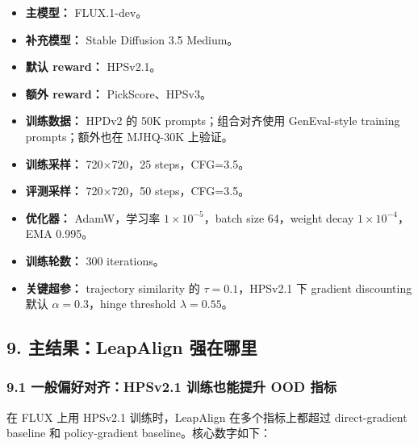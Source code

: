 \begin{itemize}[leftmargin=1.5em]
  \item \textbf{主模型：} FLUX.1-dev。
  \item \textbf{补充模型：} Stable Diffusion 3.5 Medium。
  \item \textbf{默认 reward：} HPSv2.1。
  \item \textbf{额外 reward：} PickScore、HPSv3。
  \item \textbf{训练数据：} HPDv2 的 50K prompts；组合对齐使用 GenEval-style training prompts；额外也在 MJHQ-30K 上验证。
  \item \textbf{训练采样：} 720\(\times\)720，25 steps，CFG=3.5。
  \item \textbf{评测采样：} 720\(\times\)720，50 steps，CFG=3.5。
  \item \textbf{优化器：} AdamW，学习率 \(1\times10^{-5}\)，batch size 64，weight decay \(1\times10^{-4}\)，EMA 0.995。
  \item \textbf{训练轮数：} 300 iterations。
  \item \textbf{关键超参：} trajectory similarity 的 \(\tau=0.1\)，HPSv2.1 下 gradient discounting 默认 \(\alpha=0.3\)，hinge threshold \(\lambda=0.55\)。
\end{itemize}

\subsection{9. 主结果：LeapAlign 强在哪里}

\subsubsection{9.1 一般偏好对齐：HPSv2.1 训练也能提升 OOD 指标}

在 FLUX 上用 HPSv2.1 训练时，LeapAlign 在多个指标上都超过 direct-gradient baseline 和 policy-gradient baseline。核心数字如下：

\begin{center}
\end{center}


